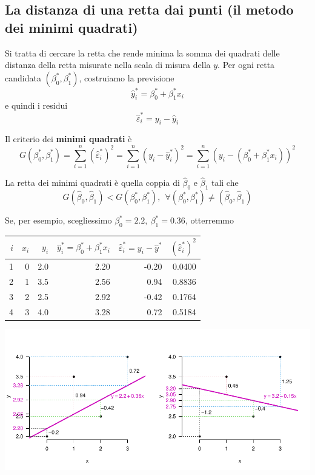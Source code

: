 \documentclass[
  11pt,
]{book}
\theoremstyle{mytheoremstyle}
\theoremstyle{mydefstyle}
\begin{document}
\subsection{La distanza di una retta dai punti (il metodo dei minimi quadrati)}\label{la-distanza-di-una-retta-dai-punti-il-metodo-dei-minimi-quadrati}

Si tratta di cercare la retta che rende minima la somma dei quadrati delle distanza
della retta misurate nella scala di misura della \(y\).
Per ogni retta candidata \((\beta_0^*,\beta_1^*)\), costruiamo la previsione
\[\hat y_i^*=\beta_0^*+\beta_1^*x_i\]
e quindi i residui
\[\hat\varepsilon_i^*=y_i-\hat y_i\]

Il criterio dei \textbf{minimi quadrati} è
\[G(\beta_0^*,\beta_1^*)=\sum_{i=1}^n ({\hat\varepsilon_i^*})^{2} =\sum_{i=1}^n(y_i-\hat y_i^*)^2=\sum_{i=1}^n(y_i-(\beta_0^*+\beta_1^*x_i))^2\]

La retta dei minimi quadrati è quella coppia di \(\hat\beta_0\) e \(\hat\beta_1\) tali che
\[G(\hat\beta_0,\hat\beta_1)<G(\beta_0^*,\beta_1^*),~~\forall(\beta_0^*,\beta_1^*)\neq(\hat\beta_0,\hat\beta_1)\]

Se, per esempio, scegliessimo \(\beta_0^*=2.2,~\beta_1^*=0.36\), otterremmo

\begin{tabular}{rrrrrr}
\toprule
$i$ & $x_i$ & $y_i$ & $\hat y_i^*=\beta_0^*+\beta_1^*x_i$ & $\hat\varepsilon_i^*=y_i-\hat y^*$ & $({\hat\varepsilon_i^*})^2$\\
\midrule
1 & 0 & 2.0 & 2.20 & -0.20 & 0.0400\\
2 & 1 & 3.5 & 2.56 & 0.94 & 0.8836\\
3 & 2 & 2.5 & 2.92 & -0.42 & 0.1764\\
4 & 3 & 4.0 & 3.28 & 0.72 & 0.5184\\
\bottomrule
\end{tabular}

\begin{center}\includegraphics{Appunti_di_Statistica_2025_files/figure-latex/17-regressione-I-32-1} \end{center}
\end{document}
